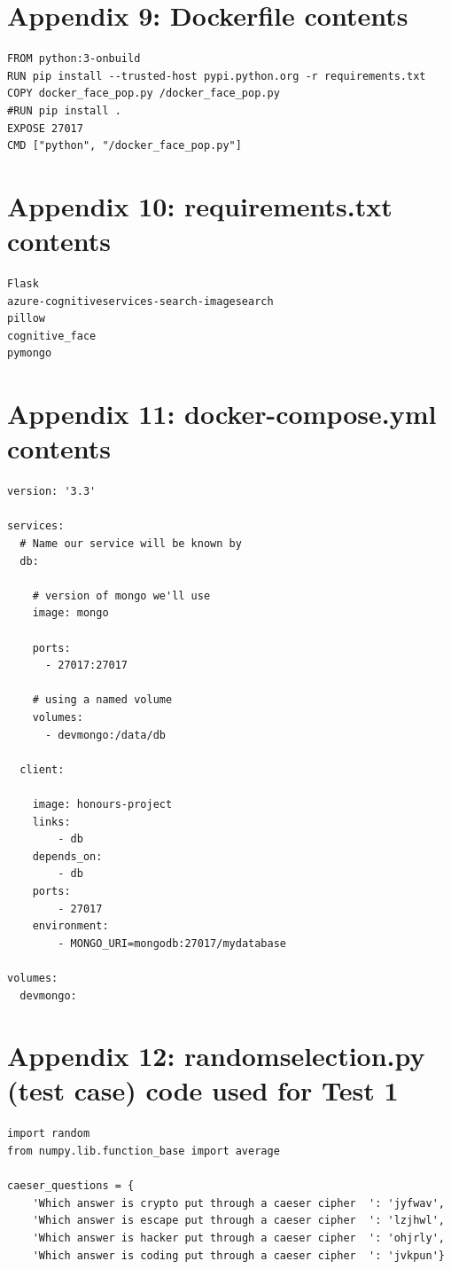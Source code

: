 \documentclass[12pt,a4paper]{article}
\begin{document}
\begin{appendices}
\begin{lstlisting}
\end{lstlisting}
\section{Appendix 9: Dockerfile contents}   
\begin{lstlisting}
FROM python:3-onbuild
RUN pip install --trusted-host pypi.python.org -r requirements.txt
COPY docker_face_pop.py /docker_face_pop.py
#RUN pip install . 
EXPOSE 27017
CMD ["python", "/docker_face_pop.py"]
\end{lstlisting}
\section{Appendix 10: requirements.txt contents}  
\begin{lstlisting}
Flask 
azure-cognitiveservices-search-imagesearch  
pillow 
cognitive_face
pymongo
\end{lstlisting}
\section{Appendix 11: docker-compose.yml contents}  
\begin{lstlisting}
version: '3.3'

services:  
  # Name our service will be known by
  db:

    # version of mongo we'll use
    image: mongo

    ports:
      - 27017:27017

    # using a named volume
    volumes:
      - devmongo:/data/db 
      
  client: 
  
    image: honours-project
    links:
        - db 
    depends_on: 
        - db
    ports:
        - 27017
    environment:
        - MONGO_URI=mongodb:27017/mydatabase

volumes:  
  devmongo:
\end{lstlisting}
\section{Appendix 12: random\textunderscore selection.py (test case) code used for Test 1}   
\begin{lstlisting}
import random 
from numpy.lib.function_base import average

caeser_questions = { 
    'Which answer is crypto put through a caeser cipher  ': 'jyfwav', 
    'Which answer is escape put through a caeser cipher  ': 'lzjhwl', 
    'Which answer is hacker put through a caeser cipher  ': 'ohjrly',  
    'Which answer is coding put through a caeser cipher  ': 'jvkpun'}   


\end{lstlisting}
\end{appendices}
\end{document}
